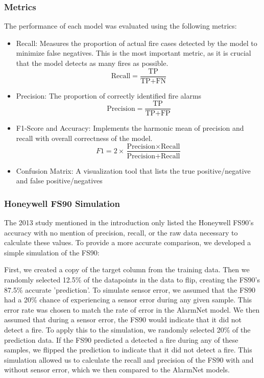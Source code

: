 \documentclass[conference]{IEEEtran}
\begin{document}
\subsubsection{Metrics}
The performance of each model was evaluated using the
following metrics:
\begin{itemize}
    \item Recall: Measures the proportion of actual fire
    cases detected by the model to minimize false negatives.
    This is the most important metric, as it is crucial that
    the model detects as many fires as possible.
    \begin{equation}
        \text{Recall} = \frac{\text{TP}}{\text{TP} + \text{FN}}
    \end{equation}
    \item Precision: The proportion of correctly identified
    fire alarms
    \begin{equation}
        \text{Precision} = \frac{\text{TP}}{\text{TP} + \text{FP}}
    \end{equation}
    \item F1-Score and Accuracy: Implements the harmonic
    mean of precision and recall with overall correctness of
    the model.
    \begin{equation}
        F1 = 2 \times \frac{\text{Precision} \times \text{Recall}}{\text{Precision} + \text{Recall}}
    \end{equation}
    \item Confusion Matrix: A visualization tool that lists
    the true positive/negative and false positive/negatives
\end{itemize}

\subsubsection{Honeywell FS90 Simulation}
The 2013 study mentioned in the introduction only listed the
Honeywell FS90's accuracy with no mention of precision,
recall, or the raw data necessary to calculate these values\cite{smokeacc}.
To provide a more accurate comparison, we developed a simple
simulation of the FS90:

First, we created a copy of the target column from the
training data. Then we randomly selected 12.5\% of the
datapoints in the data to flip, creating the FS90's 87.5\%
accurate 'prediction'. To simulate sensor error, we assumed
that the FS90 had a 20\% chance of experiencing a sensor
error during any given sample. This error rate was chosen to
match the rate of error in the AlarmNet model. We then
assumed that during a sensor error, the FS90 would indicate
that it did not detect a fire. To apply this to the
simulation, we randomly selected 20\% of the prediction
data. If the FS90 predicted a detected a fire during any of
these samples, we flipped the prediction to indicate that it
did not detect a fire. This simulation allowed us to
calculate the recall and precision of the FS90 with and
without sensor error, which we then compared to the AlarmNet
models.
\end{document}
